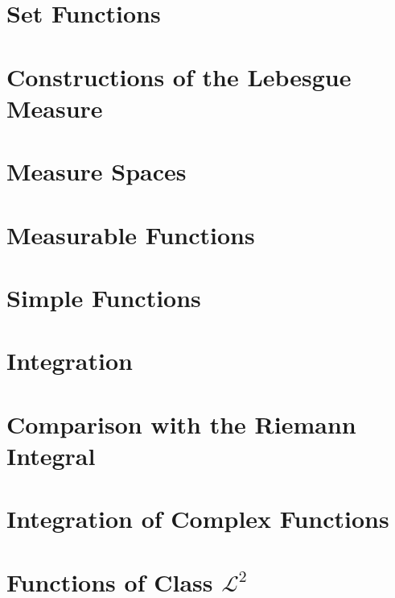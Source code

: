 
\section{Set Functions}\label{sec:set-functions}


\section{Constructions of the Lebesgue Measure}\label{sec:constructions-of-the-lebesgue-measure}


\section{Measure Spaces}\label{sec:measure-spaces}


\section{Measurable Functions}\label{sec:measurable-functions}


\section{Simple Functions}\label{sec:simple-functions}


\section{Integration}\label{sec:integration}


\section{Comparison with the Riemann Integral}\label{sec:comparison-with-the-riemann-integral}


\section{Integration of Complex Functions}\label{sec:integration-of-complex-functions}


\section{Functions of Class \texorpdfstring{$\mathscr{L}^2$}{L^2}}\label{sec:functions-of-class-L2}

